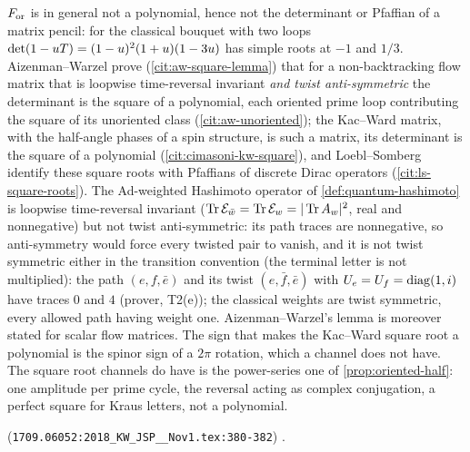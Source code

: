 \begin{observation}
\label{obs:oriented-half-not-polynomial}
$F_{\mathrm{or}}$ is in general not a polynomial, hence not the determinant or Pfaffian of a matrix pencil: for the
classical bouquet with two loops $\det(1-uT) = (1-u)^2(1+u)(1-3u)$ has simple roots at $-1$
and $1/3$. Aizenman--Warzel prove (\cref{cit:aw-square-lemma}) that for a non-backtracking flow matrix
that is loopwise time-reversal invariant \emph{and twist anti-symmetric} the determinant is the square of a
polynomial, each oriented prime loop contributing the square of its unoriented class
(\cref{cit:aw-unoriented}); the Kac--Ward matrix, with the half-angle phases of a spin structure, is such a
matrix, its determinant is the square of a polynomial (\cref{cit:cimasoni-kw-square}), and Loebl--Somberg
identify these square roots with Pfaffians of discrete Dirac operators (\cref{cit:ls-square-roots}). The
Ad-weighted Hashimoto operator of \cref{def:quantum-hashimoto} is loopwise time-reversal invariant
($\operatorname{Tr}\mathcal E_{\bar w} = \operatorname{Tr}\mathcal E_{w} = |\operatorname{Tr}A_{w}|^2$, real and nonnegative) but not twist anti-symmetric: its
path traces are nonnegative, so anti-symmetry would force every twisted pair to vanish, and it is not twist
symmetric either in the transition convention (the terminal letter is not multiplied): the path
$(e,f,\bar e)$ and its twist $(e,\bar f,\bar e)$ with $U_{e} = U_{f} = \operatorname{diag}(1,i)$ have
traces $0$ and $4$ (prover, T2(e)); the classical weights are twist symmetric, every allowed path having
weight one. Aizenman--Warzel's lemma is moreover stated for scalar flow matrices. The sign that makes the
Kac--Ward square root a polynomial is the spinor sign of a $2\pi$ rotation, which a channel does not have.
The square root channels do have is the power-series one of \cref{prop:oriented-half}: one amplitude per
prime cycle, the reversal acting as complex conjugation, a perfect square for Kraus letters, not a polynomial.
\end{observation}

\begin{citedfact}
\label{cit:aw-square-lemma}
\sloppy
{\small\texttt{}}
(\texttt{1709.06052:2018\_KW\_JSP\_\_Nov1.tex:380-382}) \cite{aizenman2018kacward}.
\end{citedfact}

